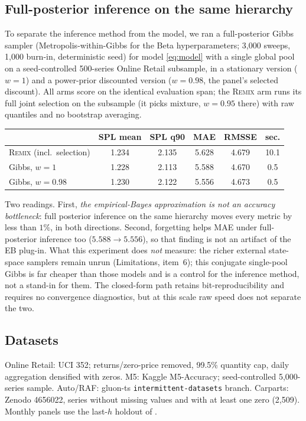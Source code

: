 \documentclass[twocolumn,10pt]{article}
\newcommand{\REMIX}{\textsc{Remix}}
\begin{document}
\subsection{Full-posterior inference on the same hierarchy}
\label{app:mcmc}

To separate the inference method from the model, we ran a full-posterior
Gibbs sampler (Metropolis-within-Gibbs for the Beta hyperparameters;
3{,}000 sweeps, 1{,}000 burn-in, deterministic seed) for model
\eqref{eq:model} with a single global pool on a seed-controlled
500-series Online Retail subsample, in a stationary version ($w{=}1$)
and a power-prior discounted version ($w{=}0.98$, the panel's selected
discount). All arms score on the identical evaluation span; the \REMIX{}
arm runs its full joint selection on the subsample (it picks mixture,
$w{=}0.95$ there) with raw quantiles and no bootstrap averaging.

\begin{table}[h]
\centering
\small
\begin{tabular}{lccccc}
\toprule
 & SPL mean & SPL q90 & MAE & RMSSE & sec.\\
\midrule
\REMIX{} (incl.\ selection) & 1.234 & 2.135 & 5.628 & 4.679 & 10.1\\
Gibbs, $w{=}1$ & 1.228 & 2.113 & 5.588 & 4.670 & 0.5\\
Gibbs, $w{=}0.98$ & 1.230 & 2.122 & 5.556 & 4.673 & 0.5\\
\bottomrule
\end{tabular}
\end{table}

Two readings. First, \emph{the empirical-Bayes approximation is not an
accuracy bottleneck}: full posterior inference on the same hierarchy
moves every metric by less than $1\%$, in both directions. Second,
forgetting helps MAE under full-posterior inference too
($5.588\to5.556$), so that finding is not an artifact of the EB plug-in.
What this experiment does \emph{not} measure: the richer external
state-space samplers
\citep{chapados2014,seeger2016} remain unrun (Limitations, item~6); this
conjugate single-pool Gibbs is far cheaper than those models and is a
control for the inference method, not a stand-in for them. The
closed-form path retains bit-reproducibility and requires no convergence
diagnostics, but at this scale raw speed does not separate the two.

\subsection{Datasets}
Online Retail: UCI 352; returns/zero-price removed, 99.5\% quantity cap,
daily aggregation densified with zeros. M5: Kaggle M5-Accuracy;
seed-controlled 5{,}000-series sample. Auto/RAF: gluon-ts
\texttt{intermittent-datasets} branch. Carparts: Zenodo 4656022, series
without missing values and with at least one zero (2{,}509). Monthly
panels use the last-$h$ holdout of \citet{damato2025}.
\end{document}
